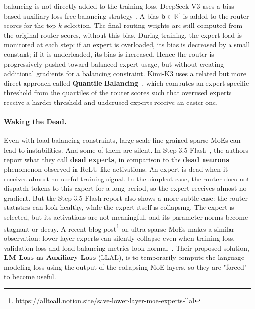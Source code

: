 balancing is not directly added to the training loss. 
DeepSeek-V3 uses a bias-based auxiliary-loss-free balancing strategy
\citep{deepseekai2024deepseekv3,wang2024auxiliarylossfree}. A bias
$\mathbf{b} \in \mathbb{R}^{e}$ is added to the router scores for the
top-$k$ selection. The final routing weights are still computed from the
original router scores, without this bias. During training, the expert load is
monitored at each step: if an expert is overloaded, its bias is decreased by a
small constant; if it is underloaded, its bias is increased. Hence the router is
progressively pushed toward balanced expert usage, but without creating
additional gradients for a balancing constraint.
Kimi-K3 uses a related but more direct approach called \textbf{Quantile
Balancing}~\citep{moonshotai2026kimik3}, which computes an expert-specific
threshold from the quantiles of the router scores such that overused experts
receive a harder threshold and underused experts receive an easier one.

\paragraph{Waking the Dead.} Even with load balancing constraints,
large-scale fine-grained sparse MoEs can lead to instabilities. And some of
them are silent. In Step 3.5 Flash~\citep{stepfun2026step35flash}, 
the authors report what they call \textbf{dead experts}, 
in comparison to the \textbf{dead neurons} phenomenon
observed in ReLU-like activations. An expert is dead when it
receives almost no useful training signal. In the simplest case, the router does
not dispatch tokens to this expert for a long period, so the expert receives
almost no gradient. But the Step 3.5 Flash report also shows a more subtle case:
the router statistics can look healthy, while the expert itself is collapsing.
The expert is selected, but its activations are not meaningful, and its parameter norms
become stagnant or decay.
A recent blog post\footnote{
    \url{https://alltoall.notion.site/save-lower-layer-moe-experts-llal}
} on ultra-sparse MoEs makes a similar observation: lower-layer
experts can silently collapse even when training loss, validation loss and load
balancing metrics look normal~\citep{jin2026llalmoe}.
Their proposed solution, \textbf{LM Loss as Auxiliary Loss} (LLAL), is to
temporarily compute the language modeling loss using the output of the collapsing MoE layers, 
so they are "forced" to become useful.

